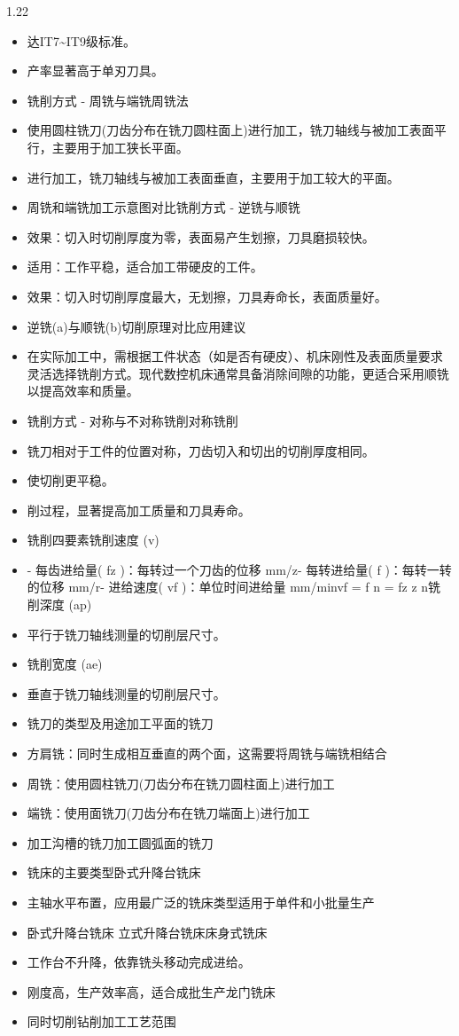 \documentclass[12pt,a4paper]{article}
\begin{document}
\begin{spacing}{1.22}
\begin{itemize}[leftmargin=2.2em,label=--]
  \item 达IT7\textasciitilde{}IT9级标准。
  \item 产率显著高于单刃刀具。
  \item 铣削方式 - 周铣与端铣周铣法
  \item 使用圆柱铣刀(刀齿分布在铣刀圆柱面上)进行加工，铣刀轴线与被加工表面平行，主要用于加工狭长平面。
  \item 进行加工，铣刀轴线与被加工表面垂直，主要用于加工较大的平面。
  \item 周铣和端铣加工示意图对比铣削方式 - 逆铣与顺铣
  \item 效果：切入时切削厚度为零，表面易产生划擦，刀具磨损较快。
  \item 适用：工作平稳，适合加工带硬皮的工件。
  \item 效果：切入时切削厚度最大，无划擦，刀具寿命长，表面质量好。
  \item 逆铣(a)与顺铣(b)切削原理对比应用建议
  \item 在实际加工中，需根据工件状态（如是否有硬皮）、机床刚性及表面质量要求灵活选择铣削方式。现代数控机床通常具备消除间隙的功能，更适合采用顺铣以提高效率和质量。
  \item 铣削方式 - 对称与不对称铣削对称铣削
  \item 铣刀相对于工件的位置对称，刀齿切入和切出的切削厚度相同。
  \item 使切削更平稳。
  \item 削过程，显著提高加工质量和刀具寿命。
  \item 铣削四要素铣削速度 (v)
  \item - 每齿进给量( fz )：每转过一个刀齿的位移 mm/z- 每转进给量( f )：每转一转的位移 mm/r- 进给速度( vf )：单位时间进给量 mm/minvf = f n = fz z n铣削深度 (ap)
  \item 平行于铣刀轴线测量的切削层尺寸。
  \item 铣削宽度 (ae)
  \item 垂直于铣刀轴线测量的切削层尺寸。
  \item 铣刀的类型及用途加工平面的铣刀
  \item 方肩铣：同时生成相互垂直的两个面，这需要将周铣与端铣相结合
  \item 周铣：使用圆柱铣刀(刀齿分布在铣刀圆柱面上)进行加工
  \item 端铣：使用面铣刀(刀齿分布在铣刀端面上)进行加工
  \item 加工沟槽的铣刀加工圆弧面的铣刀
  \item 铣床的主要类型卧式升降台铣床
  \item 主轴水平布置，应用最广泛的铣床类型适用于单件和小批量生产
  \item 卧式升降台铣床 立式升降台铣床床身式铣床
  \item 工作台不升降，依靠铣头移动完成进给。
  \item 刚度高，生产效率高，适合成批生产龙门铣床
  \item 同时切削钻削加工工艺范围
\end{itemize}


\end{spacing}
\end{document}
